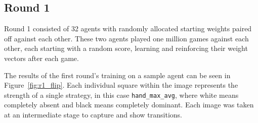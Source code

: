 

\subsection{Round 1}


Round 1 consisted of 32 agents with randomly allocated starting weights
paired off against each other.
%
These two agents played one million games against each other,
each starting with a random score,
learning and reinforcing their weight vectors after each game.

The results of the first round's training on a sample agent can be seen
in Figure~\ref{fig:r1_flip}.
%
Each individual square within the image represents the strength of a single
strategy,
in this case \texttt{hand\_max\_avg},
where white means completely absent and black means completely dominant.
%
Each image was taken at an intermediate stage to capture and show transitions.



